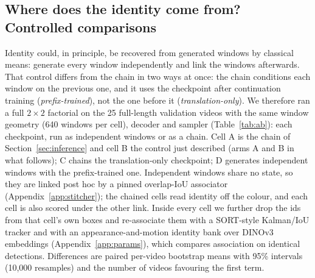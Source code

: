\documentclass{article} %
\newcommand{\rev}[1]{{\color{blue}#1}}
\begin{document}
\subsection{Where does the identity come from? Controlled comparisons}
\label{sec:ab}

Identity could, in principle, be recovered from generated windows by classical means\rev{:
generate every window independently and link the windows afterwards. That control differs
from the chain in two ways at once: the chain conditions each window on the previous one,
and it uses the checkpoint after continuation training (\emph{prefix-trained}), not the one
before it (\emph{translation-only}). We therefore ran a full $2\times2$ factorial on the 25
full-length validation videos with the same window geometry (640 windows per cell), decoder
and sampler (Table~\ref{tab:ab}): each checkpoint, run as independent windows or as a
chain. Cell A is the chain of Section~\ref{sec:inference} and cell B the control just
described (arms A and B in what follows); C chains the translation-only checkpoint; D
generates independent windows with the prefix-trained one. Independent windows share no state, so they are linked
post hoc by a pinned overlap-IoU associator (Appendix~\ref{app:stitcher}); the chained cells
read identity off the colour, and each cell is also scored under the other link. Inside
every cell we further drop the ids from that cell's own boxes and re-associate them with a
SORT-style Kalman/IoU tracker \citep{bewley2016sort} and with an appearance-and-motion
identity bank over DINOv3 embeddings (Appendix~\ref{app:params}), which compares
association on identical detections. Differences are paired per-video bootstrap means with
95\% intervals (10,000 resamples) and the number of videos favouring the first term.}
\end{document}

